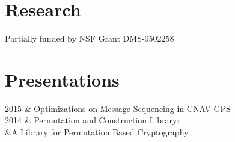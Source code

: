 \documentclass[letterpaper]{clinton-resume}
\begin{document}
\begin{minipage}[t]{0.66\textwidth}
\section{Research}
Partially funded by NSF Grant DMS-0502258
\sectionspace
\section{Presentations} 
\begin{tightTabularPresentations}
2015	 & Optimizations on Message Sequencing in CNAV GPS\\
2014     & Permutation and Construction Library: \\
		 &A Library for Permutation Based Cryptography\\
\end{tightTabularPresentations}
\sectionspace

\end{minipage}
\end{document}
